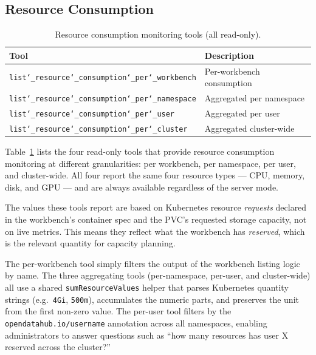 \documentclass[
  digital,     %
  oneside,     %
  nosansbold,  %
  nocolorbold, %
  lof,         %
  lot,         %
]{fithesis4}
\begin{document}
\subsection{Resource Consumption}
\label{subsec:resource-tools}

\newcommand{\ul}{\char`\_\allowbreak}%
\begin{table}[!htbp]
\caption{Resource consumption monitoring tools (all read-only).}
\label{tab:tools-consumption}
\small
\begin{tabularx}{\textwidth}{lX}
\toprule
\textbf{Tool} & \textbf{Description} \\
\midrule
\texttt{list\ul resource\ul consumption\ul per\ul workbench} & Per-workbench consumption \\
\texttt{list\ul resource\ul consumption\ul per\ul namespace} & Aggregated per namespace \\
\texttt{list\ul resource\ul consumption\ul per\ul user}      & Aggregated per user \\
\texttt{list\ul resource\ul consumption\ul per\ul cluster}   & Aggregated cluster-wide \\
\bottomrule
\end{tabularx}
\end{table}

Table~\ref{tab:tools-consumption} lists the four read-only tools that provide
resource consumption monitoring at different granularities: per workbench, per
namespace, per user, and cluster-wide. All four report the same four
resource types --- CPU, memory, disk, and GPU --- and are always available
regardless of the server mode.

The values these tools report are based on Kubernetes resource
\emph{requests} declared in the workbench's container spec and the PVC's
requested storage capacity, not on live metrics. This means they reflect
what the workbench has \emph{reserved}, which is the relevant quantity for
capacity planning.

The per-workbench tool simply filters the output of the workbench listing
logic by name. The three aggregating tools (per-namespace, per-user, and
cluster-wide) all use a shared \texttt{sumResourceValues} helper that
parses Kubernetes quantity strings (e.g.\ \texttt{4Gi}, \texttt{500m}),
accumulates the numeric parts, and preserves the unit from the first
non-zero value. The per-user tool filters by the
\texttt{opendatahub.io/username} annotation across all namespaces,
enabling administrators to answer questions such as \enquote{how many
resources has user X reserved across the cluster?}
\end{document}

